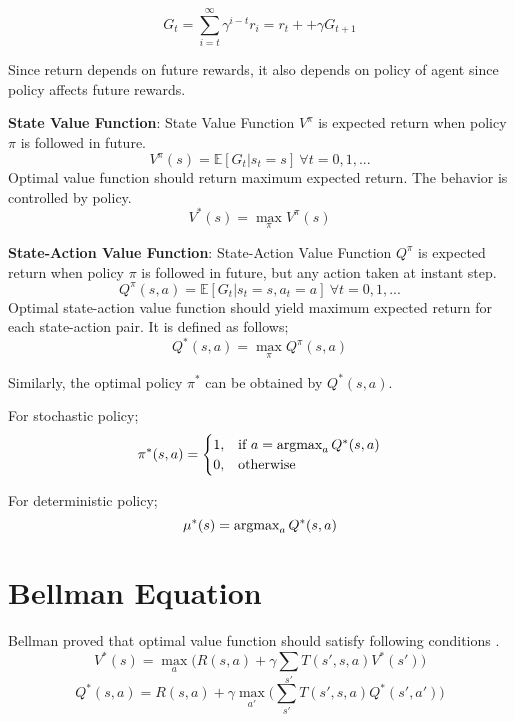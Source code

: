 \begin{equation}
G_t = \sum_{i=t}^{\infty} \gamma^{i-t} r_i = r_t + + \gamma G_{t+1}
\end{equation}

Since return depends on future rewards, it also depends on policy of agent since policy affects future rewards.

\textbf{State Value Function}: State Value Function $V^{\pi}$ is expected return when policy $\pi$ is followed in future.
%
\begin{equation}
V^{\pi}(s) = \mathbb{E}[G_t|s_t=s] \: \forall t = 0,1, ...
\end{equation}
%
Optimal value function should return maximum expected return. The behavior is controlled by policy.
%
\begin{equation}
V^{*}(s) = \max_{\pi} V^{\pi}(s)
\end{equation}

\textbf{State-Action Value Function}: State-Action Value Function $Q^{\pi}$ is expected return when policy $\pi$ is followed in future, but any action taken at instant step.
%
\begin{equation}
Q^{\pi}(s,a) = \mathbb{E}[G_t|s_t=s, a_t=a] \: \forall t = 0,1, ...
\end{equation}
%
Optimal state-action value function should yield maximum expected return for each state-action pair. It is defined as follows;
%
\begin{equation}
Q^{*}(s,a) = \max_{\pi} Q^{\pi}(s,a)
\end{equation}

Similarly, the optimal policy $\pi^*$ can be obtained by $Q^{*}(s,a)$.

For stochastic policy;
\begin{equation}
\label{eqn:policy_stochastic_q}
\pi^{*}(s,a) = 
\begin{cases}
1,   & \text{if  } a = \operatorname{\textup{argmax}}_{a} Q^{*}(s,a) \\
0,   & \text{otherwise  }
\end{cases} 
\end{equation}

For deterministic policy;
\begin{equation}
\label{eqn:policy_deterministic_q}
\mu^{*}(s) = \operatorname{\textup{argmax}}_{a} Q^{*}(s,a)
\end{equation}

\section{Bellman Equation}

Bellman proved that optimal value function should satisfy following conditions \cite{bellman_dynamic_2003}.
%
\begin{equation}
\label{eqn:bellman_v}
V^{*}(s) = \max_{a} \big( R(s,a) + \gamma \sum_{s'} T(s',s,a) V^{*}(s') \big)
\end{equation}
%
\begin{equation}
\label{eqn:bellman_q}
Q^{*}(s,a) = R(s,a) + \gamma \max_{a'} \big( \sum_{s'} T(s',s,a) Q^{*}(s',a') \big)
\end{equation}

